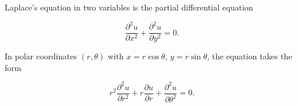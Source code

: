 Laplace's equation in two variables is the partial differential equation

$$\frac{\partial^2 u}{\partial x^2} + \frac{\partial^2 u}{\partial y^2} = 0.$$

In polar coordinates $(r, \theta)$ with $x = r\cos\theta$, $y = r\sin\theta$, the equation takes the form

$$r^2 \frac{\partial^2 u}{\partial r^2} + r \frac{\partial u}{\partial r} + \frac{\partial^2 u}{\partial \theta^2} = 0.$$
